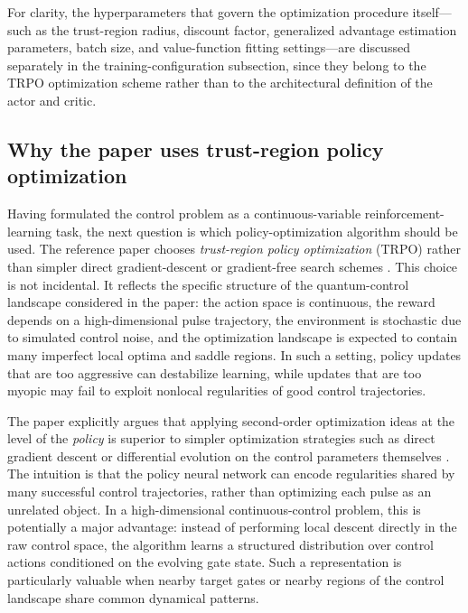 For clarity, the hyperparameters that govern the optimization procedure itself---such as the trust-region radius, discount factor, generalized advantage estimation parameters, batch size, and value-function fitting settings---are discussed separately in the training-configuration subsection, since they belong to the TRPO optimization scheme rather than to the architectural definition of the actor and critic.


\subsection{Why the paper uses trust-region policy optimization}
\label{subsec:why_paper_uses_trpo}

Having formulated the control problem as a continuous-variable reinforcement-learning task, the next question is which policy-optimization algorithm should be used. The reference paper chooses \emph{trust-region policy optimization} (TRPO) rather than simpler direct gradient-descent or gradient-free search schemes \cite{Niu2019,Schulman2015}. This choice is not incidental. It reflects the specific structure of the quantum-control landscape considered in the paper: the action space is continuous, the reward depends on a high-dimensional pulse trajectory, the environment is stochastic due to simulated control noise, and the optimization landscape is expected to contain many imperfect local optima and saddle regions. In such a setting, policy updates that are too aggressive can destabilize learning, while updates that are too myopic may fail to exploit nonlocal regularities of good control trajectories.

The paper explicitly argues that applying second-order optimization ideas at the level of the \emph{policy} is superior to simpler optimization strategies such as direct gradient descent or differential evolution on the control parameters themselves \cite{Niu2019}. The intuition is that the policy neural network can encode regularities shared by many successful control trajectories, rather than optimizing each pulse as an unrelated object. In a high-dimensional continuous-control problem, this is potentially a major advantage: instead of performing local descent directly in the raw control space, the algorithm learns a structured distribution over control actions conditioned on the evolving gate state. Such a representation is particularly valuable when nearby target gates or nearby regions of the control landscape share common dynamical patterns.

